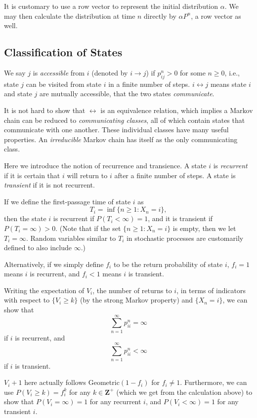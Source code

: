 \documentclass[11pt]{article}
\newcommand{\Z}{\mathbf{Z}}
\begin{document}
It is customary to use a row vector to represent the initial distribution $\alpha $. We may then calculate the distribution at time $n$ directly by $\alpha P^{n}$, a row vector as well.

\subsection{Classification of States}
We say $j$ is \textit{accessible} from $i$ (denoted by $i\rightarrow j$) if $p_{ij}^{n}>0$ for some $n\geq 0$, i.e., state $j$ can be visited from state $i$ in a finite number of steps. $i \leftrightarrow j$ means state $i$ and state $j$ are mutually accessible, that the two states \textit{communicate}.

It is not hard to show that $\leftrightarrow$ is an equivalence relation, which implies a Markov chain can be reduced to \textit{communicating classes}, all of which contain states that communicate with one another. These individual classes have many useful properties. An \textit{irreducible} Markov chain has itself as the only communicating class.

Here we introduce the notion of recurrence and transience. A state $i$ is \textit{recurrent} if it is certain that $i$ will return to $i$ after a finite number of steps. A state is \textit{transient} if it is not recurrent.

If we define the first-passage time of state $i$ as
\[
T_{i}=\inf \{n\geq 1:X_{n}=i\},
\]
then the state $i$ is recurrent if $P(T_{i}<\infty )=1$, and it is transient if $P(T_{i}=\infty )>0$. (Note that if the set $\{n\geq 1:X_{n}=i\}$ is empty, then we let $T_{i}=\infty $. Random variables similar to $T_{i}$ in stochastic processes are customarily defined to also include $\infty $.)

Alternatively, if we simply define $f_{i}$ to be the return probability of state $i$, $f_{i}=1$ means $i$ is recurrent, and $f_{i}<1$ means $i$ is transient.

Writing the expectation of $V_{i}$, the number of returns to $i$, in terms of indicators with respect to $\{V_{i}\geq k\}$ (by the strong Markov property) and $\{X_{n}=i\}$, we can show that
\[
\sum_{n=1}^{\infty }p_{ii}^{n}=\infty 
\]
if $i$ is recurrent, and
\[
\sum_{n=1}^{\infty }p_{ii}^{n}<\infty 
\]
if $i$ is transient.

\noindent {} $V_{i}+1$ here actually follows Geometric$(1- f_{i})$ for $f_{i}\neq 1$. Furthermore, we can use $P(V_{i}\geq k)=f_{i}^{k}$ for any $k\in \Z^+$ (which we get from the calculation above) to show that $P(V_{i}=\infty )=1$ for any recurrent $i$, and $P(V_{i}<\infty )=1$ for any transient $i$.
\end{document}
